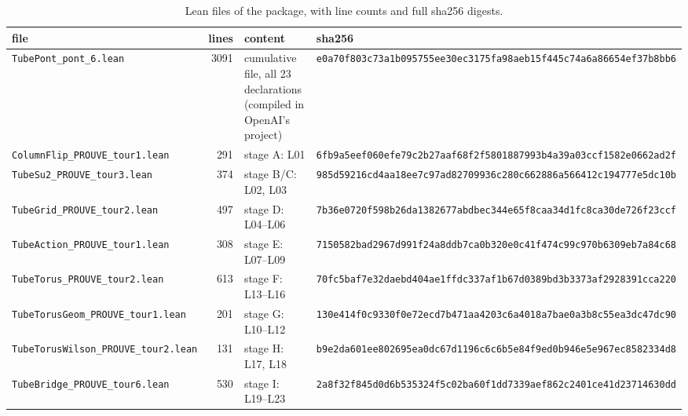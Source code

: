 \begin{table}[ht]\centering\footnotesize
\caption{Lean files of the package, with line counts and full sha256 digests.}\label{tab:sha}
\begin{tabular}{p{3.7cm}rp{3.9cm}p{5.8cm}}\toprule
file & lines & content & sha256 \\\midrule
\texttt{TubePont\_pont\_6.lean} & 3091 & cumulative file, all 23 declarations (compiled in OpenAI's project) & \texttt{e0a70f803c73a1b095755ee30ec3175f}\newline\texttt{a98aeb15f445c74a6a86654ef37b8bb6} \\
\texttt{ColumnFlip\_PROUVE\_tour1.lean} & 291 & stage A: L01 & \texttt{6fb9a5eef060efe79c2b27aaf68f2f58}\newline\texttt{01887993b4a39a03ccf1582e0662ad2f} \\
\texttt{TubeSu2\_PROUVE\_tour3.lean} & 374 & stage B/C: L02, L03 & \texttt{985d59216cd4aa18ee7c97ad82709936}\newline\texttt{c280c662886a566412c194777e5dc10b} \\
\texttt{TubeGrid\_PROUVE\_tour2.lean} & 497 & stage D: L04--L06 & \texttt{7b36e0720f598b26da1382677abdbec3}\newline\texttt{44e65f8caa34d1fc8ca30de726f23ccf} \\
\texttt{TubeAction\_PROUVE\_tour1.lean} & 308 & stage E: L07--L09 & \texttt{7150582bad2967d991f24a8ddb7ca0b3}\newline\texttt{20e0c41f474c99c970b6309eb7a84c68} \\
\texttt{TubeTorus\_PROUVE\_tour2.lean} & 613 & stage F: L13--L16 & \texttt{70fc5baf7e32daebd404ae1ffdc337af}\newline\texttt{1b67d0389bd3b3373af2928391cca220} \\
\texttt{TubeTorusGeom\_PROUVE\_tour1.lean} & 201 & stage G: L10--L12 & \texttt{130e414f0c9330f0e72ecd7b471aa420}\newline\texttt{3c6a4018a7bae0a3b8c55ea3dc47dc90} \\
\texttt{TubeTorusWilson\_PROUVE\_tour2.lean} & 131 & stage H: L17, L18 & \texttt{b9e2da601ee802695ea0dc67d1196c6c}\newline\texttt{6b5e84f9ed0b946e5e967ec8582334d8} \\
\texttt{TubeBridge\_PROUVE\_tour6.lean} & 530 & stage I: L19--L23 & \texttt{2a8f32f845d0d6b535324f5c02ba60f1}\newline\texttt{dd7339aef862c2401ce41d23714630dd} \\
\bottomrule\end{tabular}\end{table}
